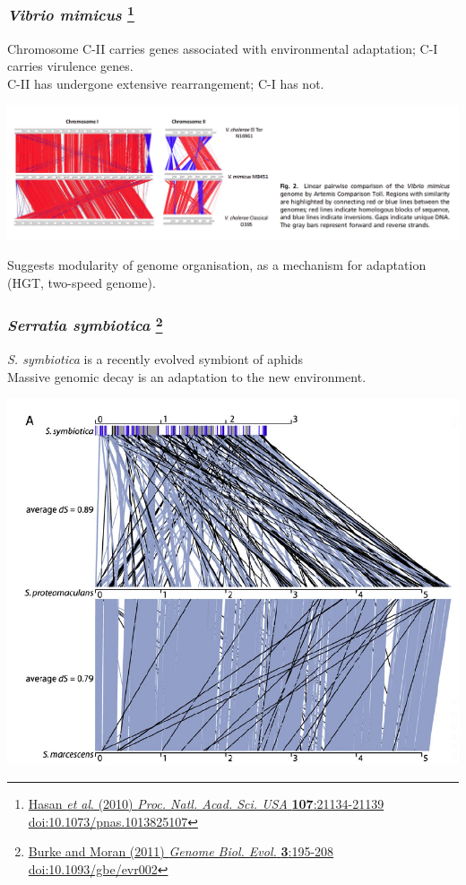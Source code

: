 \begin{frame}
  \frametitle{\textit{Vibrio mimicus} 
  \footnote{\tiny{\href{http://dx.doi.org/10.1073/pnas.1013825107}{Hasan \textit{et al}. (2010) \textit{Proc. Natl. Acad. Sci. USA} \textbf{107}:21134-21139 doi:10.1073/pnas.1013825107}}}
  }
  Chromosome C-II carries genes associated with environmental adaptation; C-I carries virulence genes.\\
  C-II has undergone extensive rearrangement; C-I has not.\\
  \begin{center}
    \includegraphics[width=1\textwidth]{images/v_mimicus}
  \end{center}    
  Suggests modularity of genome organisation, as a mechanism for adaptation (HGT, two-speed genome).
\end{frame}

\begin{frame}
  \frametitle{\textit{Serratia symbiotica} 
  \footnote{\tiny{\href{http://dx.doi.org/10.1093/gbe/evr002}{Burke and Moran (2011) \textit{Genome Biol. Evol.} \textbf{3}:195-208 doi:10.1093/gbe/evr002}}}
  }
  \textit{S. symbiotica} is a recently evolved symbiont of aphids\\
  \textcolor{hutton_purple}{Massive genomic decay is an adaptation to the new environment.}\\
  \begin{center}
    \includegraphics[width=0.75\textheight]{images/s_symbiotica}
  \end{center}    
\end{frame}

